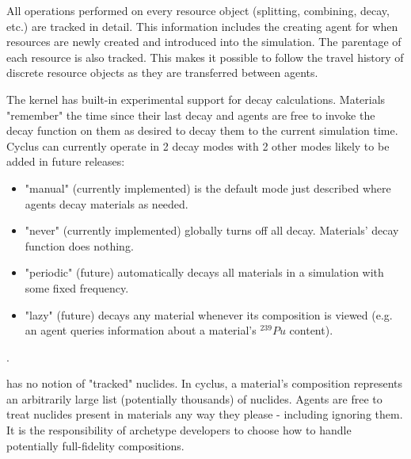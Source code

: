 All operations performed on every resource object (splitting, combining,
decay, etc.) are tracked in detail.  This information includes the creating
agent for when resources are newly created and introduced into the simulation.
The parentage of each resource is also tracked. This makes it possible to
follow the travel history of discrete resource objects as they are transferred
between agents.

The \Cyclus kernel has built-in experimental support for decay calculations.
Materials "remember" the time since their last decay and agents are free to
invoke the decay function on them as desired to decay them to the current
simulation time.  Cyclus can currently operate in 2 decay modes with 2 other
modes likely to be added in future releases:

\begin{itemize}

    \item "manual" (currently implemented) is the default mode just described where agents decay
        materials as needed.

    \item "never" (currently implemented) globally turns off all decay.  Materials' decay function
        does nothing.

    \item "periodic" (future) automatically decays all materials in a
        simulation with some fixed frequency.

    \item "lazy" (future) decays any material whenever its composition is
        viewed (e.g. an agent queries information about a material's
        $^{239}Pu$ content).

\end{itemize}

.

\Cyclus has no notion of "tracked" nuclides.  In cyclus, a  material's
composition represents an arbitrarily large list (potentially thousands) of
nuclides.  Agents are free to treat nuclides present in materials any way they
please - including ignoring them.  It is the responsibility of archetype
developers to choose how to handle potentially full-fidelity compositions.

